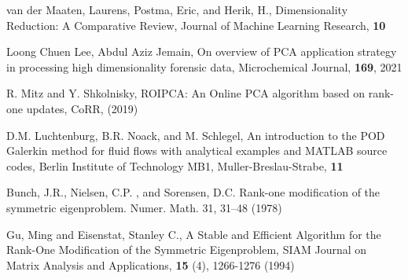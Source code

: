 \documentclass[onecolumn]{webofc}
\begin{document}
 \begin{thebibliography}{9}

van der Maaten, Laurens, Postma, Eric, and Herik, H., Dimensionality Reduction: A Comparative Review, Journal of Machine Learning Research, \textbf{10}

Loong Chuen Lee, Abdul Aziz Jemain,
On overview of PCA application strategy in processing high dimensionality forensic data,
Microchemical Journal,
\textbf{169},
2021

R. Mitz and Y. Shkolnisky, ROIPCA: An Online PCA algorithm based on rank-one updates, CoRR, (2019)

D.M. Luchtenburg, B.R. Noack, and M. Schlegel, An introduction to the POD Galerkin method for fluid flows with analytical examples and MATLAB source codes, Berlin Institute of Technology MB1, Muller-Breslau-Strabe, \textbf{11}

Bunch, J.R., Nielsen, C.P. , and Sorensen, D.C. Rank-one modification of the symmetric eigenproblem. Numer. Math. 31, 31–48 (1978)

Gu, Ming and Eisenstat, Stanley C., A Stable and Efficient Algorithm for the Rank-One Modification of the Symmetric Eigenproblem,  SIAM Journal on Matrix Analysis and Applications, \textbf{15} (4), 1266-1276 (1994)

 \end{thebibliography}
\end{document}
